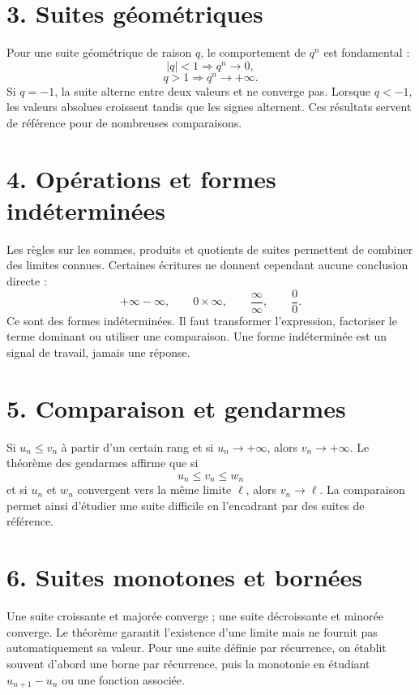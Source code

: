 
\section{3. Suites géométriques}
Pour une suite géométrique de raison $q$, le comportement de $q^n$ est fondamental :
\[
|q|<1\Longrightarrow q^n\to0,
\]
\[
q>1\Longrightarrow q^n\to+\infty.
\]
Si $q=-1$, la suite alterne entre deux valeurs et ne converge pas. Lorsque $q<-1$, les valeurs absolues croissent tandis que les signes alternent. Ces résultats servent de référence pour de nombreuses comparaisons.

\section{4. Opérations et formes indéterminées}
Les règles sur les sommes, produits et quotients de suites permettent de combiner des limites connues. Certaines écritures ne donnent cependant aucune conclusion directe :
\[
+\infty-\infty,\qquad 0\times\infty,\qquad \frac{\infty}{\infty},\qquad \frac00.
\]
Ce sont des formes indéterminées. Il faut transformer l'expression, factoriser le terme dominant ou utiliser une comparaison. Une forme indéterminée est un signal de travail, jamais une réponse.

\section{5. Comparaison et gendarmes}
Si $u_n\le v_n$ à partir d'un certain rang et si $u_n\to+\infty$, alors $v_n\to+\infty$. Le théorème des gendarmes affirme que si
\[
u_n\le v_n\le w_n
\]
et si $u_n$ et $w_n$ convergent vers la même limite $\ell$, alors $v_n\to\ell$. La comparaison permet ainsi d'étudier une suite difficile en l'encadrant par des suites de référence.


\section{6. Suites monotones et bornées}
Une suite croissante et majorée converge ; une suite décroissante et minorée converge. Le théorème garantit l'existence d'une limite mais ne fournit pas automatiquement sa valeur. Pour une suite définie par récurrence, on établit souvent d'abord une borne par récurrence, puis la monotonie en étudiant $u_{n+1}-u_n$ ou une fonction associée.

